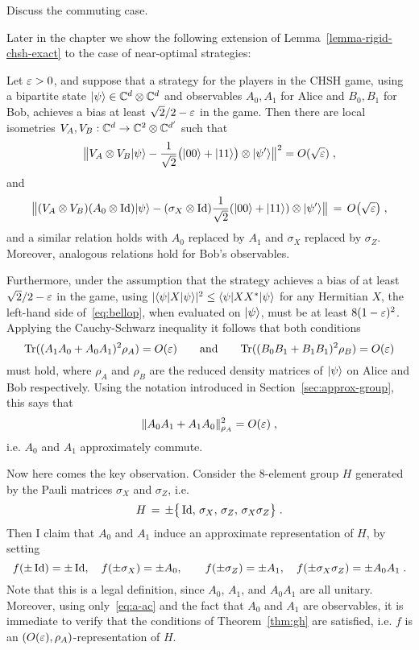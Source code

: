 \begin{remark} Discuss the commuting case.
\end{remark}



Later in the chapter we show the following extension of Lemma~\ref{lemma-rigid-chsh-exact} to the case of near-optimal strategies: 


\begin{theorem}\label{theorem-rigid-chsh}
Let $\varepsilon>0$, and suppose that a strategy for the players  in the CHSH game, using  a bipartite state $|\psi\rangle\in\mathbb{C}^d\otimes \mathbb{C}^d$ and observables $A_0,A_1$ for Alice and $B_0,B_1$ for Bob, achieves a bias at least $\sqrt{2}/2-\varepsilon$ in the game. Then there are local isometries $V_A,V_B:\mathbb{C}^d \to \mathbb{C}^2 \otimes \mathbb{C}^{d'}$ such that 
\begin{equation}\label{eq:chsh-state}
\big\| V_A \otimes V_B |\psi\rangle - \frac{1}{\sqrt{2}}\big(|00\rangle+|11\rangle\big) \otimes |\psi'\rangle \big\|^2 = O(\sqrt{\varepsilon}) \;,
\end{equation}
and 
\begin{equation}\label{eq:chsh-alice}
\big\|( V_A \otimes V_B)( A_0 \otimes \mathop{\rm Id}\nolimits )|\psi\rangle - (\sigma_X \otimes \mathop{\rm Id}\nolimits)\frac{1}{\sqrt{2}}(|00\rangle+|11\rangle) \otimes |\psi'\rangle \big\| \,=\, O\big(\sqrt{\varepsilon}\big)\;,
\end{equation}
and a similar relation holds with $A_0$ replaced by $A_1$ and $\sigma_X$ replaced by $\sigma_Z$. Moreover, analogous relations hold for Bob's observables. 
\end{theorem}


Furthermore, under the assumption that the strategy achieves a bias of at least $\sqrt{2}/2-\varepsilon$ in the game, using $|\langle\psi|X|\psi\rangle|^2 \leq \langle\psi|XX^*|\psi\rangle$ for any Hermitian $X$, the left-hand side of~\eqref{eq:bellop}, when evaluated on $|\psi\rangle$, must be at least $8(1-\varepsilon)^2$. Applying the Cauchy-Schwarz inequality it follows that both conditions
$$\mathrm{Tr}((A_1A_0 + A_0A_1)^2\rho_A) = O({\varepsilon})\qquad \text{and}\qquad \mathrm{Tr}((B_0B_1+B_1B_1)^2 \rho_B) = O({\varepsilon})$$
must hold, where $\rho_A$ and $\rho_B$ are the reduced density matrices of $|\psi\rangle$ on Alice and Bob respectively. 
Using the notation introduced in Section~\ref{sec:approx-group}, this says that 
\begin{equation}\label{eq:a-ac}
\|A_0A_1 + A_1A_0\|_{\rho_A}^2 = O({\varepsilon})\;,
\end{equation}
 i.e. $A_0$ and $A_1$ approximately commute. 

Now here comes the key observation. Consider the $8$-element group $H$ generated by the Pauli matrices $\sigma_X$ and $\sigma_Z$, i.e. 
$$H\,=\,\pm\big\{ \mathop{\rm Id}\nolimits,\, \sigma_X,\,\sigma_Z,\, \sigma_X\sigma_Z\big\}\;.$$
Then I claim that $A_0$ and $A_1$ induce an approximate representation of $H$, by setting 
$$ f(\pm \mathop{\rm Id}\nolimits)=\pm\mathop{\rm Id}\nolimits,\quad f(\pm\sigma_X)=\pm A_0,\quad\quad f(\pm\sigma_Z)=\pm A_1,\quad f(\pm\sigma_X\sigma_Z) = \pm A_0A_1\;.$$
Note that this is a legal definition, since $A_0$, $A_1$, and $A_0A_1$ are all unitary. Moreover, using only~\eqref{eq:a-ac} and the fact that $A_0$ and $A_1$ are observables, it is immediate to verify that the conditions of Theorem~\ref{thm:gh} are satisfied, i.e. $f$ is an $(O({\varepsilon}),\rho_A)$-representation of $H$. 

